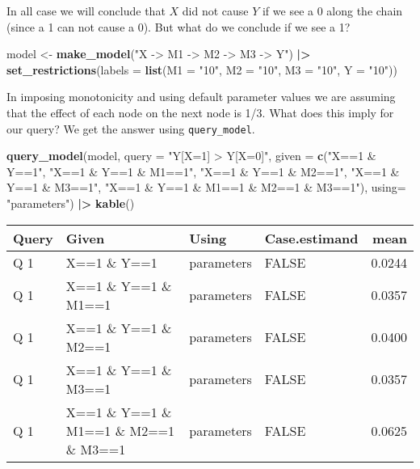 \documentclass[
  12pt,
]{book}
\newenvironment{Shaded}{\begin{snugshade}}{\end{snugshade}}
\newcommand{\AttributeTok}[1]{\textcolor[rgb]{0.13,0.29,0.53}{#1}}
\newcommand{\FunctionTok}[1]{\textcolor[rgb]{0.13,0.29,0.53}{\textbf{#1}}}
\newcommand{\NormalTok}[1]{#1}
\newcommand{\OtherTok}[1]{\textcolor[rgb]{0.56,0.35,0.01}{#1}}
\newcommand{\SpecialCharTok}[1]{\textcolor[rgb]{0.81,0.36,0.00}{\textbf{#1}}}
\newcommand{\StringTok}[1]{\textcolor[rgb]{0.31,0.60,0.02}{#1}}
\begin{document}
In all case we will conclude that \(X\) did not cause \(Y\) if we see a 0 along the chain (since a 1 can not cause a 0). But what do we conclude if we see a 1?

\begin{Shaded}
\begin{Highlighting}[]
\NormalTok{model }\OtherTok{\textless{}{-}} \FunctionTok{make\_model}\NormalTok{(}\StringTok{"X {-}\textgreater{} M1 {-}\textgreater{} M2 {-}\textgreater{} M3 {-}\textgreater{} Y"}\NormalTok{) }\SpecialCharTok{|\textgreater{}}
  \FunctionTok{set\_restrictions}\NormalTok{(}\AttributeTok{labels =} \FunctionTok{list}\NormalTok{(}\AttributeTok{M1 =} \StringTok{"10"}\NormalTok{, }\AttributeTok{M2 =} \StringTok{"10"}\NormalTok{, }\AttributeTok{M3 =} \StringTok{"10"}\NormalTok{, }\AttributeTok{Y =} \StringTok{"10"}\NormalTok{))}
\end{Highlighting}
\end{Shaded}

In imposing monotonicity and using default parameter values we are assuming that the effect of each node on the next node is 1/3. What does this imply for our query? We get the answer using \texttt{query\_model}.

\begin{Shaded}
\begin{Highlighting}[]
\FunctionTok{query\_model}\NormalTok{(model, }
            \AttributeTok{query =} \StringTok{"Y[X=1] \textgreater{} Y[X=0]"}\NormalTok{, }
            \AttributeTok{given =} \FunctionTok{c}\NormalTok{(}\StringTok{"X==1 \& Y==1"}\NormalTok{, }\StringTok{"X==1 \& Y==1 \& M1==1"}\NormalTok{, }\StringTok{"X==1 \& Y==1 \& M2==1"}\NormalTok{, }
                      \StringTok{"X==1 \& Y==1 \& M3==1"}\NormalTok{, }\StringTok{"X==1 \& Y==1 \& M1==1 \& M2==1 \& M3==1"}\NormalTok{),}
            \AttributeTok{using=} \StringTok{"parameters"}\NormalTok{) }\SpecialCharTok{|\textgreater{}} \FunctionTok{kable}\NormalTok{()}
\end{Highlighting}
\end{Shaded}

\begin{tabular}{l|l|l|l|r}
\hline
Query & Given & Using & Case.estimand & mean\\
\hline
Q 1 & X==1 \& Y==1 & parameters & FALSE & 0.0244\\
\hline
Q 1 & X==1 \& Y==1 \& M1==1 & parameters & FALSE & 0.0357\\
\hline
Q 1 & X==1 \& Y==1 \& M2==1 & parameters & FALSE & 0.0400\\
\hline
Q 1 & X==1 \& Y==1 \& M3==1 & parameters & FALSE & 0.0357\\
\hline
Q 1 & X==1 \& Y==1 \& M1==1 \& M2==1 \& M3==1 & parameters & FALSE & 0.0625\\
\hline
\end{tabular}
\end{document}
